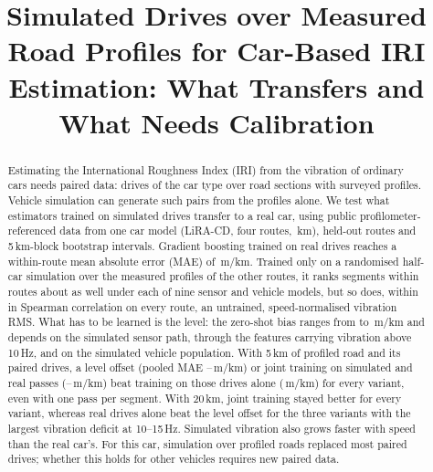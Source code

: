 \documentclass[conference]{IEEEtran}
\begin{document}
\raggedbottom
\makeatletter{}\makeatother %

\title{Simulated Drives over Measured Road Profiles for Car-Based IRI Estimation: What Transfers and What Needs Calibration}

\author{
\and
{}
}

\maketitle

\begin{abstract}
Estimating the International Roughness Index (IRI) from the vibration of ordinary cars needs paired data: drives of the car type over road sections with surveyed profiles. Vehicle simulation can generate such pairs from the profiles alone. We test what estimators trained on simulated drives transfer to a real car, using public profilometer-referenced data from one car model (LiRA-CD, four routes, \liraKm\,km), held-out routes and 5\,km-block bootstrap intervals. Gradient boosting trained on real drives reaches a within-route mean absolute error (MAE) of \vrGbmMaeWithin\,m/km. Trained only on a randomised half-car simulation over the measured profiles of the other routes, it ranks segments within routes about as well under each of nine sensor and vehicle models, but so does, within \rpAbsMax{} in Spearman correlation on every route, an untrained, speed-normalised vibration RMS. What has to be learned is the level: the zero-shot bias ranges from \vvBiasMin{} to \vvBiasMax\,m/km and depends on the simulated sensor path, through the features carrying vibration above 10\,Hz, and on the simulated vehicle population. With 5\,km of profiled road and its paired drives, a level offset (pooled MAE \pcCalMaeFiveMin--\pcCalMaeFiveMax\,m/km) or joint training on simulated and real passes (\poMaeFiveMin--\poMaeFiveMax\,m/km) beat training on those drives alone (\vbRealOnlyFive\,m/km) for every variant, even with one pass per segment. With 20\,km, joint training stayed better for every variant, whereas real drives alone beat the level offset for the three variants with the largest vibration deficit at 10--15\,Hz. Simulated vibration also grows faster with speed than the real car's. For this car, simulation over profiled roads replaced most paired drives; whether this holds for other vehicles requires new paired data.
\end{abstract}
\end{document}

